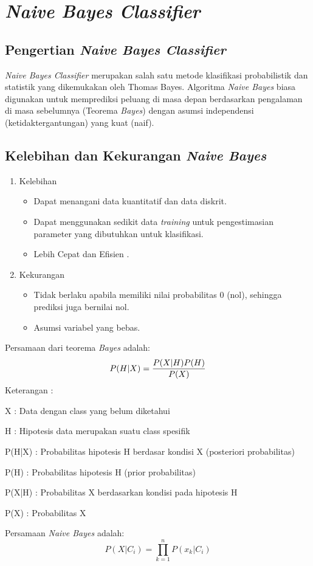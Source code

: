 \section{\textit{Naive Bayes Classifier}}
\subsection{Pengertian \textit{Naive Bayes Classifier}}
\textit{Naive Bayes Classifier} merupakan salah satu metode klasifikasi probabilistik dan statistik yang dikemukakan oleh Thomas Bayes. Algoritma \textit{Naive Bayes} biasa digunakan untuk memprediksi peluang di masa depan  berdasarkan pengalaman di masa sebelumnya (Teorema \textit{Bayes}) dengan asumsi independensi (ketidaktergantungan) yang kuat (naif)\cite{saleh2015implementasi}.
\subsection{Kelebihan dan Kekurangan \textit{Naive Bayes}}
\begin{enumerate}
    \item Kelebihan
    \begin{itemize}
        \item Dapat menangani data kuantitatif dan data diskrit.
        \item Dapat menggunakan sedikit data \textit{training} untuk pengestimasian parameter yang dibutuhkan untuk klasifikasi.
        \item Lebih Cepat dan Efisien \cite{hidayat2018klasifikasi}.
    \end{itemize}
    \item Kekurangan
    \begin{itemize}
        \item Tidak berlaku apabila memiliki nilai probabilitas 0 (nol), sehingga prediksi juga bernilai nol.
        \item Asumsi variabel yang bebas\cite{akbar2017prediksi}.
    \end{itemize}
\end{enumerate}
Persamaan dari teorema \textit{Bayes} adalah:
\begin{equation}
P(H|X) = \frac{P(X|H)P(H)}{P(X)} \\
\end{equation}
Keterangan : 
\par X 		: Data dengan class yang belum diketahui 
\par H 		: Hipotesis data merupakan suatu class spesifik 
\par P(H|X) 	: Probabilitas hipotesis H berdasar kondisi X (posteriori       probabilitas) 
\par P(H) 		: Probabilitas hipotesis H (prior probabilitas) 
\par P(X|H) 	: Probabilitas X berdasarkan kondisi pada hipotesis H 
\par P(X) 	: Probabilitas X 
\par Persamaan \textit{Naive Bayes} adalah:
\begin{equation}
    P(X|C_{i})=\prod_{k=1}^{n}P(x_{k}|C_{i})
    \label{rumus2}
\end{equation}
